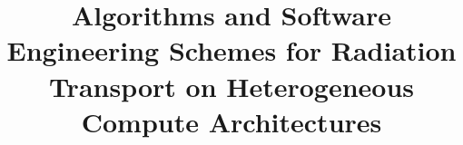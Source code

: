 \documentclass[11pt,onehalf]{general/beavtex}
\title{Algorithms and Software Engineering Schemes for Radiation Transport on Heterogeneous Compute Architectures}
\author{\TheAuthors{}}
\newcommand{\TheAuthors}{Joanna Piper Morgan}
\begin{document}
\maketitle

\mainmatter



\newcommand{\TheTitle}{BLANK}
\renewcommand{\TheAuthors}{BLANK}
\newcommand{\TheAddress}{BLANK}







\newpage


\printbibliography[]


\appendix

\newpage

\newpage

\end{document}
